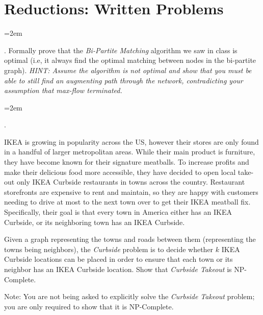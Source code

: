 \documentclass[12pt]{article}
\def\homework{Reductions: Written Problems}
\newcounter{quesnum}
\newcommand{\question}[2][??]{
\begin{list}{\labelitemi}{\leftmargin=2em}
\item [\arabic{quesnum}.] {#2}
\end{list}
\addtocounter{quesnum}{1}
}
\begin{document}
\section*{\homework}




\question[1]{
Formally prove that the \emph{Bi-Partite Matching} algorithm we saw in class is optimal (i.e, it always find the optimal matching between nodes in the bi-partite graph). \emph{HINT: Assume the algorithm is not optimal and show that you must be able to still find an augmenting path through the network, contradicting your assumption that max-flow terminated.}
}





\question[3]{
IKEA is growing in popularity across the US, however their stores are only found in a handful of larger metropolitan areas.  While their main product is furniture, they have become known for their signature meatballs.  To increase profits and make their delicious food more accessible, they have decided to open local take-out only IKEA Curbside restaurants in towns across the country.  Restaurant storefronts are expensive to rent and maintain, so they are happy with customers needing to drive at most to the next town over to get their IKEA meatball fix.  Specifically, their goal is that every town in America either has an IKEA Curbside, or its neighboring town has an IKEA Curbside.

Given a graph representing the towns and roads between them (representing the towns being neighbors), the \emph{Curbside} problem is to decide whether $k$ IKEA Curbside locations can be placed in order to ensure that each town or its neighbor has an IKEA Curbside location.  Show that \emph{Curbside Takeout} is NP-Complete.

Note: You are not being asked to explicitly solve the \emph{Curbside Takeout} problem; you are only required to show that it is NP-Complete.
}

\end{document}
